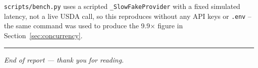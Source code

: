 \documentclass[11pt,a4paper]{article}
\begin{document}
\texttt{scripts/bench.py} uses a scripted \texttt{\_SlowFakeProvider} with a
fixed simulated latency, not a live USDA call, so this reproduces without
any API keys or \texttt{.env} -- the same command was used to produce the
9.9$\times$ figure in Section~\ref{sec:concurrency}.

\vspace{1em}\hrule\vspace{0.6em}
\noindent\small\textit{End of report --- thank you for reading.}
\end{document}
